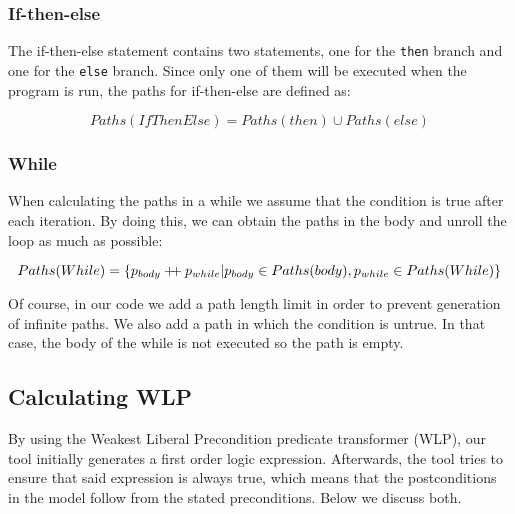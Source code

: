 \documentclass[a4paper]{article}
\newcommand\mdoubleplus{\ensuremath{\mathbin{+\mkern-5mu+}}}
\begin{document}
\subsubsection*{If-then-else}

The if-then-else statement contains two statements, one for the \texttt{then} branch
and one for the \texttt{else} branch. Since only one of them will be executed
when the program is run, the paths for if-then-else are defined as:

\[ Paths(IfThenElse) = Paths(then) \cup Paths(else) \]

%

\subsubsection*{While}

When calculating the paths in a while we assume that the condition is true
after each iteration. By doing this, we can obtain the paths in the body and
unroll the loop as much as possible:

\[ Paths(While) = \{ p_{body} \mdoubleplus p_{while} | p_{body} \in Paths(body), p_{while} \in Paths(While)\} \]

Of course, in our code we add a path length limit in order to prevent generation
of infinite paths. We also add a path in which the condition is untrue. In that
case, the body of the while is not executed so the path is empty.


\subsection{Calculating WLP}



By using the Weakest Liberal Precondition predicate transformer (WLP), our
tool initially generates a first order logic expression. Afterwards, the tool
tries to ensure that said expression is always true, which means that the
postconditions in the model follow from the stated preconditions. Below we
discuss both.
\end{document}
